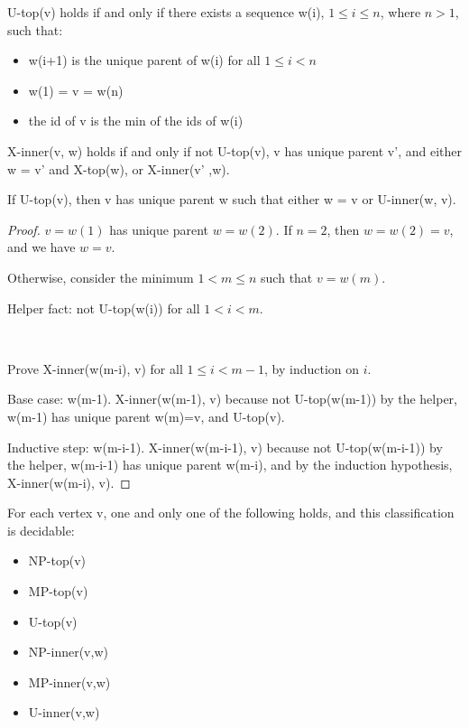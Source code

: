 \documentclass[acmsmall,dvipsnames,10pt,review,anonymous]{acmart}\settopmatter{printfolios=true}
\begin{document}

\begin{definition}
    U-top(v) holds if and only if there exists a sequence w(i), $1 \leq i \leq n$, where $n > 1$, such that: 
    \begin{itemize}
        \item w(i+1) is the unique parent of w(i) for all $1\leq i < n$
        \item w(1) = v = w(n)
        \item the id of v is the min of the ids of w(i)
    \end{itemize}
\end{definition}

\begin{definition}
    X-inner(v, w) holds if and only if not U-top(v), v has unique parent v’, and either w = v’ and X-top(w), or X-inner(v’ ,w).
\end{definition}

\begin{lemma}
\label{lem:u-top}
    If U-top(v), then v has unique parent w such that either w = v or U-inner(w, v).
\end{lemma}
\begin{proof}

    $v=w(1)$ has unique parent $w=w(2)$. If $n=2$, then $w=w(2)=v$, and we have $w=v$.
    
    Otherwise, consider the minimum $1<m\leq n$ such that $v=w(m)$. 

    Helper fact: not U-top(w(i)) for all $1 < i < m$.

    \ 
    
    Prove X-inner(w(m-i), v) for all $1\leq i < m-1$, by induction on $i$. 

    Base case: w(m-1). X-inner(w(m-1), v) because not U-top(w(m-1)) by the helper, w(m-1) has unique parent w(m)=v, and U-top(v). 

    Inductive step: w(m-i-1). X-inner(w(m-i-1), v) because not U-top(w(m-i-1)) by the helper, w(m-i-1) has unique parent w(m-i), and by the induction hypothesis, X-inner(w(m-i), v). 
\end{proof}

\begin{theorem}
\label{thm:vertex-class}
    For each vertex v, one and only one of the following holds, and this classification is decidable:
\begin{itemize}
    \item NP-top(v)
    \item MP-top(v) 
    \item U-top(v)
    \item NP-inner(v,w)
    \item MP-inner(v,w)
    \item U-inner(v,w)
\end{itemize}
\end{theorem}
\end{document}
